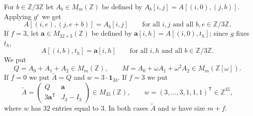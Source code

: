 \documentclass[11pt,a4paper]{article}
\theoremstyle{remark}
\newcommand{\ZZ}{\mathbb{Z}}
\newcommand{\one}{\mathbf{1}}
\newcommand{\tp}{\mathsf{T}}
\newcommand{\av}{\mathbf{a}}
\newcommand{\tA}{\widetilde{A}}
\begin{document}
For $b\in\ZZ/3\ZZ$ let $A_b\in M_m(\ZZ)$ be defined by $A_b[i,j]=A[(i,0),(j,b)]$. Applying $g^{e}$ we get
\begin{equation}\label{eq:shift}
A[(i,e),(j,e+b)]=A_b[i,j]\qquad\text{for all }i,j\text{ and all }b,e\in\ZZ/3\ZZ .
\end{equation}
If $f=3$, let $\av\in M_{32\times3}(\ZZ)$ be defined by $\av[i,h]=A[(i,0),t_h]$; since $g$ fixes $t_h$,
\begin{equation}\label{eq:shifta}
A[(i,b),t_h]=\av[i,h]\qquad\text{for all }i,h\text{ and all }b\in\ZZ/3\ZZ .
\end{equation}
We put
\[
Q=A_0+A_1+A_2\in M_m(\ZZ),\qquad M=A_0+\omega A_1+\omega^2A_2\in M_m(\ZZ[\omega]).
\]
If $f=0$ we put $\tA=Q$ and $w=3\cdot\one_{33}$. If $f=3$ we put
\[
\tA=\begin{pmatrix}Q&\av\\ 3\av^{\tp}&J_3-I_3\end{pmatrix}\in M_{35}(\ZZ),\qquad
w=(3,\dots,3,1,1,1)^{\tp}\in\ZZ^{35},
\]
where $w$ has $32$ entries equal to $3$. In both cases $\tA$ and $w$ have size $m+f$.
\end{document}
